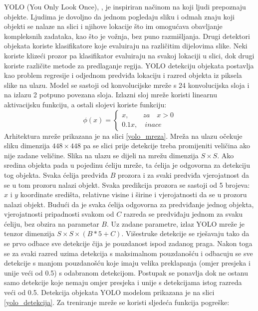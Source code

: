 YOLO (You Only Look Once), \cite{DBLP:journals/corr/RedmonDGF15}, je inspiriran načinom na koji ljudi prepoznaju objekte. Ljudima je dovoljno da jednom pogledaju sliku i odmah znaju koji objekti se nalaze na slici i njihove lokacije što im omogućava obavljanje kompleksnih zadataka, kao što je vožnja, bez puno razmišljanja. 
Drugi detektori objekata koriste klasifikatore koje evaluiraju na različitim dijelovima slike. Neki koriste klizeći prozor pa klasifikator evaluiraju na svakoj lokaciji u slici, dok drugi koriste različite metode za predlaganje regija. YOLO detekciju objekata postavlja kao problem regresije i odjednom predviđa lokaciju i razred objekta iz piksela slike na ulazu. Model se sastoji od konvolucijske mreže s 24 konvolucijska sloja i na izlazu 2 potpuno povezana sloja. Izlazni sloj mreže koristi linearnu aktivacijsku funkciju, a ostali slojevi koriste funkciju:
\[
	\phi (x) = 
	\begin{cases}
		x, \quad \quad za \quad x > 0 \\
		0.1x, \quad inace
	\end{cases}
\]
 Arhitektura mreže prikazana je na slici \ref{yolo_mreza}. Mreža na ulazu očekuje sliku dimenzija $448 \times 448$ pa se slici prije detekcije treba promijeniti veličina ako nije zadane veličine. Slika na ulazu se dijeli na mrežu dimenzija $S \times S$. Ako sredina objekta pada u pojedinu ćeliju mreže, ta ćelija je odgovorna za detekciju tog objekta. Svaka ćelija predviđa $B$ prozora i za svaki predviđa vjerojatnost da se u tom prozoru nalazi objekt. Svaka predikcija prozora se sastoji od 5 brojeva: $x$ i $y$ koordinate središta, relativne visine i širine i vjerojatnosti da se u prozoru nalazi objekt. Budući da je svaka ćelija odgovorna za predviđanje jednog objekta, vjerojatnosti pripadnosti svakom od $C$ razreda se predviđaju jednom za svaku ćeliju, bez obzira na parametar $B$. Uz zadane parametre, izlaz YOLO mreže je tenzor dimenzija $S \times S \times (B \ast 5 + C)$. Višestruke detekcije se rješavaju tako da se prvo odbace sve detekcije čija je pouzdanost ispod zadanog praga. Nakon toga se za svaki razred uzima detekcija s maksimalnom pouzdanošću i odbacuju se sve detekcije s manjom pouzdanošću koje imaju velika preklapanja (omjer presjeka i unije veći od 0.5) s odabranom detekcijom. Postupak se ponavlja dok ne ostanu samo detekcije koje nemaju omjer presjeka i unije s detekcijama istog razreda veći od 0.5. Detekcija objekata YOLO modelom prikazana je na slici \ref{yolo_detekcija}. Za treniranje mreže se koristi sljedeća funkcija pogreške:
